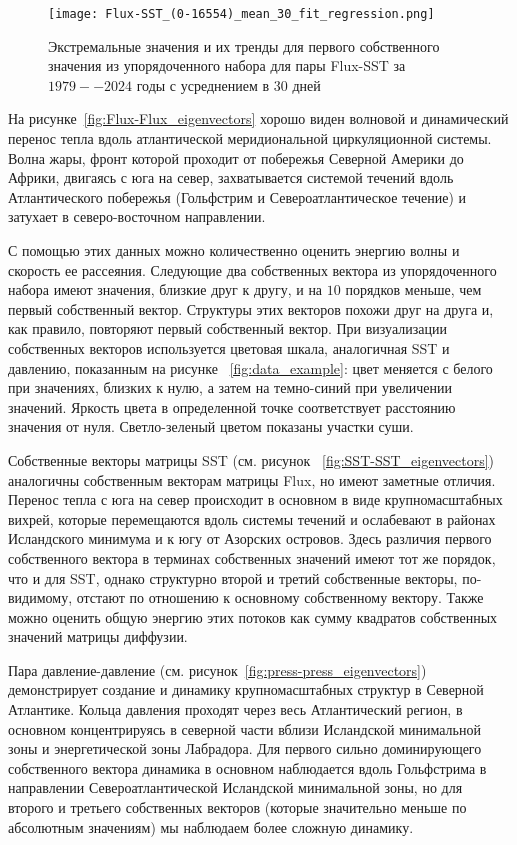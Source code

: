 \begin{figure}
	\centering
	\texttt{[image: Flux-SST\_(0-16554)\_mean\_30\_fit\_regression.png]}
	\caption{Экстремальные значения и их тренды для первого собственного значения из упорядоченного набора для пары Flux-SST за $1979--2024$ годы с усреднением в $30$ дней}
	\label{fig:Flux-SST_trends}
\end{figure}

На рисунке~\ref{fig:Flux-Flux_eigenvectors} хорошо виден волновой и динамический перенос тепла вдоль атлантической меридиональной циркуляционной системы. Волна жары, фронт которой проходит от побережья Северной Америки до Африки, двигаясь с юга на север, захватывается системой течений вдоль Атлантического побережья (Гольфстрим и Североатлантическое течение) и затухает в северо-восточном направлении.

С помощью этих данных можно количественно оценить энергию волны и скорость ее рассеяния. Следующие два собственных вектора из упорядоченного набора имеют значения, близкие друг к другу, и на $10$ порядков меньше, чем первый собственный вектор. Структуры этих векторов похожи друг на друга и, как правило, повторяют первый собственный вектор. При визуализации собственных векторов используется цветовая шкала, аналогичная SST и давлению, показанным на рисунке ~\ref{fig:data_example}: цвет меняется с белого при значениях, близких к нулю, а затем на темно-синий при увеличении значений. Яркость цвета в определенной точке соответствует расстоянию значения от нуля. Светло-зеленый цветом показаны участки суши.

Собственные векторы матрицы SST (см. рисунок ~\ref{fig:SST-SST_eigenvectors}) аналогичны собственным векторам матрицы Flux, но имеют заметные отличия. Перенос тепла с юга на север происходит в основном в виде крупномасштабных вихрей, которые перемещаются вдоль системы течений и ослабевают в районах Исландского минимума и к югу от Азорских островов. Здесь различия первого собственного вектора в терминах собственных значений имеют тот же порядок, что и для SST, однако структурно второй и третий собственные векторы, по-видимому, отстают по отношению к основному собственному вектору. Также можно оценить общую энергию этих потоков как сумму квадратов собственных значений матрицы диффузии.


Пара давление-давление (см. рисунок~\ref{fig:press-press_eigenvectors}) демонстрирует создание и динамику крупномасштабных структур в Северной Атлантике. Кольца давления проходят через весь Атлантический регион, в основном концентрируясь в северной части вблизи Исландской минимальной зоны и энергетической зоны Лабрадора. Для первого сильно доминирующего собственного вектора динамика в основном наблюдается вдоль Гольфстрима в направлении Североатлантической Исландской минимальной зоны, но для второго и третьего собственных векторов (которые значительно меньше по абсолютным значениям) мы наблюдаем более сложную динамику.


